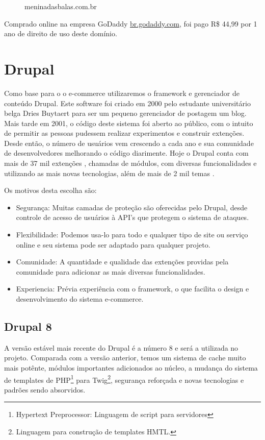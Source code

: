\begin{figure}
  \centering
    \large
    meninadasbalas.com.br
\end{figure}

Comprado online na empresa GoDaddy \url{br.godaddy.com}, foi pago R\$ 44,99 por 1 ano de direito de uso deste domínio.

\section{Drupal}

Como base para o o e-commerce utilizaremos o framework e gerenciador de conteúdo Drupal. Este software foi criado em 2000 pelo estudante universitário belga Dries Buytaert para ser um pequeno gerenciador de postagem um blog. Mais tarde em 2001, o código deste sistema foi aberto ao público, com o intuito de permitir as pessoas pudessem realizar experimentos e construir extenções. Desde então, o número de usuários vem crescendo a cada ano e sua comunidade de desenvolvedores melhorando o código diarimente. Hoje o Drupal conta com mais de 37 mil extenções \cite{DrupalModules}, chamadas de módulos, com diversas funcionalidades e utilizando as mais novas tecnologias, além de mais de 2 mil temas \cite{DrupalTheme}.

Os motivos desta escolha são:

\begin{itemize}
  \item Segurança: Muitas camadas de proteção são oferecidas pelo Drupal, desde controle de acesso de usuários à API's que protegem o sistema de ataques.
  \item Flexibilidade: Podemos usa-lo para todo e qualquer tipo de site ou serviço online e seu sistema pode ser adaptado para qualquer projeto.
  \item Comunidade: A quantidade e qualidade das extenções providas pela comunidade para adicionar as mais diversas funcionalidades.
  \item Experiencia: Prévia experiência com o framework, o que facilita o design e desenvolvimento do sistema e-commerce.
\end{itemize}

\subsection{Drupal 8}

A versão estável mais recente do Drupal é a número 8 e será a utilizada no projeto. Comparada com a versão anterior, temos um sistema de cache muito mais potênte, módulos importantes adicionados ao núcleo, a mudança do sistema de templates de PHP\footnote{Hypertext Preprocessor: Linguagem de script para servidores} para Twig\footnote{Linguagem para construção de templates HMTL.}, segurança reforçada e novas tecnologias e padrões sendo absorvidos. 

